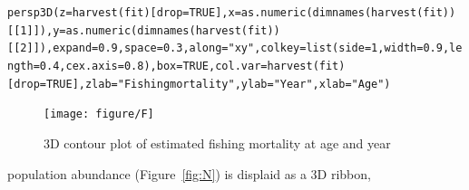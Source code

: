 \documentclass[a4paper,english,10pt]{article}\usepackage[]{graphicx}\usepackage[]{color}
\makeatletter
\newcommand{\hlnum}[1]{\textcolor[rgb]{0.2,0.2,0.2}{#1}}%
\newcommand{\hlstr}[1]{\textcolor[rgb]{0.2,0.2,0.2}{#1}}%
\newcommand{\hlstd}[1]{\textcolor[rgb]{0,0,0}{#1}}%
\newcommand{\hlkwc}[1]{\textcolor[rgb]{0.361,0.506,0.596}{#1}}%
\newcommand{\hlkwd}[1]{\textcolor[rgb]{0.361,0.506,0.596}{#1}}%
\newenvironment{kframe}{%
 \def\at@end@of@kframe{}%
 \ifinner\ifhmode%
  \def\at@end@of@kframe{\end{minipage}}%
  \begin{minipage}{\columnwidth}%
 \fi\fi%
 \def\FrameCommand##1{\hskip\@totalleftmargin \hskip-\fboxsep
 \colorbox{shadecolor}{##1}\hskip-\fboxsep
     \hskip-\linewidth \hskip-\@totalleftmargin \hskip\columnwidth}%
 \MakeFramed {\advance\hsize-\width
   \@totalleftmargin\z@ \linewidth\hsize
   \@setminipage}}%
 {\par\unskip\endMakeFramed%
 \at@end@of@kframe}
\newenvironment{knitrout}{}{} %
\makeatother
\begin{document}
\begin{knitrout}
\color{fgcolor}\begin{kframe}
\begin{alltt}
\hlkwd{persp3D}\hlstd{(}\hlkwc{z}\hlstd{=}\hlkwd{harvest}\hlstd{(fit)[}\hlkwc{drop}\hlstd{=}\hlnum{TRUE}\hlstd{],} \hlkwc{x}\hlstd{=}\hlkwd{as.numeric}\hlstd{(}\hlkwd{dimnames}\hlstd{(}\hlkwd{harvest}\hlstd{(fit))[[}\hlnum{1}\hlstd{]]),} \hlkwc{y}\hlstd{=}\hlkwd{as.numeric}\hlstd{(}\hlkwd{dimnames}\hlstd{(}\hlkwd{harvest}\hlstd{(fit))[[}\hlnum{2}\hlstd{]]),} \hlkwc{expand} \hlstd{=} \hlnum{0.9}\hlstd{,} \hlkwc{space} \hlstd{=} \hlnum{0.3}\hlstd{,} \hlkwc{along} \hlstd{=} \hlstr{"xy"}\hlstd{,} \hlkwc{colkey} \hlstd{=} \hlkwd{list}\hlstd{(}\hlkwc{side}\hlstd{=}\hlnum{1}\hlstd{,} \hlkwc{width} \hlstd{=} \hlnum{0.9}\hlstd{,} \hlkwc{length} \hlstd{=} \hlnum{0.4}\hlstd{,} \hlkwc{cex.axis} \hlstd{=} \hlnum{0.8}\hlstd{),} \hlkwc{box} \hlstd{=} \hlnum{TRUE}\hlstd{,} \hlkwc{col.var}\hlstd{=}\hlkwd{harvest}\hlstd{(fit)[}\hlkwc{drop}\hlstd{=}\hlnum{TRUE}\hlstd{],} \hlkwc{zlab}\hlstd{=}\hlstr{"Fishing mortality"}\hlstd{,} \hlkwc{ylab}\hlstd{=}\hlstr{"Year"}\hlstd{,} \hlkwc{xlab}\hlstd{=}\hlstr{"Age"}\hlstd{)}
\end{alltt}
\end{kframe}\begin{figure}[H]


{\centering \texttt{[image: figure/F]} 

}

\caption[3D contour plot of estimated fishing mortality at age and year]{3D contour plot of estimated fishing mortality at age and year\label{fig:F}}
\end{figure}


\end{knitrout}

population abundance (Figure~\ref{fig:N}) is displaid as a 3D ribbon, 
\end{document}
